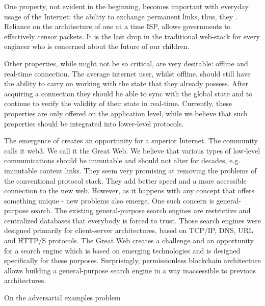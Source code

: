 \documentclass[8pt,oneside]{amsart}
\makeatletter
\newcommand{\linkgreen}[2]{\href{#1}{\color{green}{#2}}}
\renewcommand\subsection{\@startsection{subsection}
                                    {2}{\z@}
                                    {-3.25ex\@plus -1ex \@minus -.2ex}
                                    {0ex \@plus .2ex}
                                    {\play\Large}
                        }
\newcommand{\titleSection}[1]{\subsection{#1}}
\makeatother
\begin{document}
One property, not evident in the beginning, becomes important with everyday usage of the Internet: the ability to exchange permanent links, thus, they \linkgreen{https://ipfs.io/ipfs/QmNhaUrhM7KcWzFYdBeyskoNyihrpHvUEBQnaddwPZigcN}{would not break after time had passed}. Reliance on the architecture of one at a time ISP, allows governments to effectively censor packets. It is the last drop in the traditional web-stack for every engineer who is concerned about the future of our children.

Other properties, while might not be so critical, are very desirable: offline and real-time connection. The average internet user, whilst offline, should still have the ability to carry on working with the state that they already possess. After acquiring a connection they should be able to sync with the global state and to continue to verify the validity of their state in real-time. Currently, these properties are only offered on the application level, while we believe that such properties should be integrated into lower-level protocols.

The emergence of \linkgreen{https://ipfs.io/ipfs/Qmf2rKkDPSsvdudwSmdDPbZuYae8XRV26c1wAFCCvg8Dhw}{a brand-new web-stack} creates an opportunity for a superior Internet. The community calls it web3. We call it the Great Web. We believe that various types of low-level communications should be immutable and should not alter for decades, e.g. immutable content links. They seem very promising at removing the problems of the conventional protocol stack. They add better speed and a more accessible connection to the new web. However, as it happens with any concept that offers something unique - new problems also emerge. One such concern is general-purpose search. The existing general-purpose search engines are restrictive and centralized databases that everybody is forced to trust. Those search engines were designed primarily for client-server architectures, based on TCP/IP, DNS, URL and HTTP/S protocols. The Great Web creates a challenge and an opportunity for a search engine which is based on emerging technologies and is designed specifically for these purposes. Surprisingly, permissionless blockchain architecture allows building a general-purpose search engine in a way inaccessible to previous architectures.

\titleSection{On the adversarial examples problem}\label{adversarial-examples}
\end{document}
